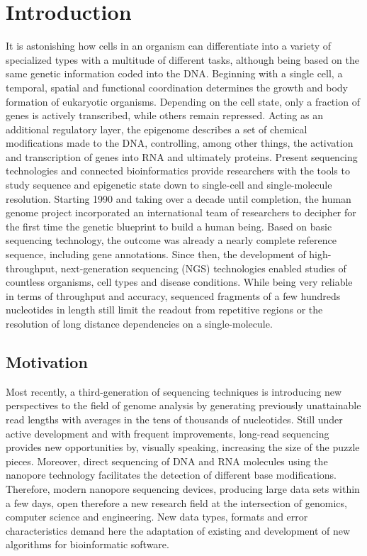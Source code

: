 \chapter{Introduction}
\label{cha:intro}

It is astonishing how cells in an organism can differentiate into a variety of specialized types with a multitude of different tasks, although being based on the same genetic information coded into the DNA.
Beginning with a single cell, a temporal, spatial and functional coordination determines the growth and body formation of eukaryotic organisms.
Depending on the cell state, only a fraction of genes is actively transcribed, while others remain repressed.
Acting as an additional regulatory layer, the epigenome describes a set of chemical modifications made to the DNA, controlling, among other things, the activation and transcription of genes into RNA and ultimately proteins.
Present sequencing technologies and connected bioinformatics provide researchers with the tools to study sequence and epigenetic state down to single-cell and single-molecule resolution.
Starting 1990 and taking over a decade until completion, the human genome project incorporated an international team of researchers to decipher for the first time the genetic blueprint to build a human being. 
Based on basic sequencing technology, the outcome was already a nearly complete reference sequence, including gene annotations.
Since then, the development of high-throughput, next-generation sequencing (NGS) technologies enabled studies of countless organisms, cell types and disease conditions. 
While being very reliable in terms of throughput and accuracy, sequenced fragments of a few hundreds nucleotides in length still limit the readout from repetitive regions or the resolution of long distance dependencies on a single-molecule.




\section{Motivation}
\label{sec:intro:motivation}

Most recently, a third-generation of sequencing techniques is introducing new perspectives to the field of genome analysis by generating previously unattainable read lengths with averages in the tens of thousands of nucleotides. 
Still under active development and with frequent improvements, long-read sequencing provides new opportunities by, visually speaking, increasing the size of the puzzle pieces.
Moreover, direct sequencing of DNA and RNA molecules using the nanopore technology facilitates the detection of different base modifications.
Therefore, modern nanopore sequencing devices, producing large data sets within a few days, open therefore a new research field at the intersection of genomics, computer science and engineering. 
New data types, formats and error characteristics demand here the adaptation of existing and development of new algorithms for bioinformatic software.




